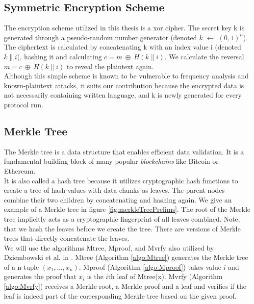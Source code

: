 \documentclass{cacthesis}
\newcounter{protocol}
\begin{document}
            \subsection{Symmetric Encryption Scheme}
            \label{sub:SymmetricEncryptionScheme}
	        The encryption scheme utilized in this thesis is a xor cipher. The secret key k is generated through a pseudo-random number generator (denoted $k$ $\leftarrow$ $(0, 1)^n$). The ciphertext is calculated by concatenating k with an index value i (denoted $k\|i$), hashing it and calculating  $c = m \ \oplus \ H(k\|i)$. We calculate the reversal $m = c \ \oplus \ H(k\|i)$ to reveal the plaintext again. \\
            Although this simple scheme is known to be vulnerable to frequency analysis and known-plaintext attacks, it suits our contribution because the encrypted data is not necessarily containing written language, and k is newly generated for every protocol run.

            \subsection{Merkle Tree}
            \label{sub:MerkleTree}
	        The Merkle tree is a data structure that enables efficient data validation. It is a fundamental building block of many popular \textit{blockchains} like Bitcoin or Ethereum. \\
            It is also called a hash tree because it utilizes cryptographic hash functions to create a tree of hash values with data chunks as leaves. The parent nodes combine their two children by concatenating and hashing again. We give an example of a Merkle tree in figure \ref{fig:merkleTreePrelims}. The root of the Merkle tree implicitly acts as a cryptographic fingerprint of all leaves combined. Note, that we hash the leaves before we create the tree. There are versions of Merkle trees that directly concatenate the leaves. \\
            We will use the algorithms \textsf{Mtree}, \textsf{Mproof}, and \textsf{Mvrfy} also utilized by Dziembowski et al. in \cite{10.1145/3243734.3243857}. \textsf{Mtree} (Algorithm \ref{algo:Mtree}) generates the Merkle tree of a n-tuple $(x_1, ..., x_n)$. \textsf{Mproof} (Algorithm \ref{algo:Mproof}) takes value $i$ and generates the proof that $x_i$ is the $i$th leaf of \textsf{Mtree(x)}. \textsf{Mvrfy} (Algorithm \ref{algo:Mvrfy}) receives a Merkle root, a Merkle proof and a leaf and verifies if the leaf is indeed part of the corresponding Merkle tree based on the given proof. 
            
\end{document}
